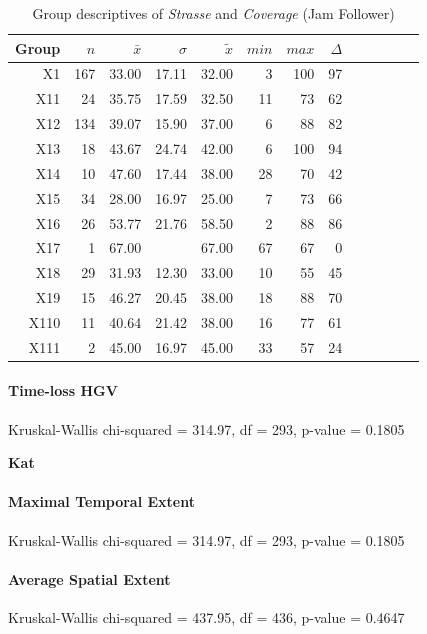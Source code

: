 \begin{table}[ht]
	\tiny
	\centering
	\begin{tabular}{rrrrrrrrrrrrr}
		\hline
		Group & $n$ & $\bar{x}$ & $\sigma$ & $\tilde{x}$ & $min$ & $max$ & $\Delta$ \\ 
		\hline
		X1  & 167 & 33.00 & 17.11 & 32.00 & 3  & 100 & 97 \\ 
		X11 & 24  & 35.75 & 17.59 & 32.50 & 11 & 73  & 62 \\ 
		X12 & 134 & 39.07 & 15.90 & 37.00 & 6  & 88  & 82 \\ 
		X13 & 18  & 43.67 & 24.74 & 42.00 & 6  & 100 & 94 \\ 
		X14 & 10  & 47.60 & 17.44 & 38.00 & 28 & 70  & 42 \\ 
		X15 & 34  & 28.00 & 16.97 & 25.00 & 7  & 73  & 66 \\ 
		X16 & 26  & 53.77 & 21.76 & 58.50 & 2  & 88  & 86 \\ 
		X17 & 1   & 67.00 &  	  & 67.00 & 67 & 67  & 0 \\  
		X18 & 29  & 31.93 & 12.30 & 33.00 & 10 & 55  & 45 \\ 
		X19 & 15  & 46.27 & 20.45 & 38.00 & 18 & 88  & 70 \\ 
		X110 & 11 & 40.64 & 21.42 & 38.00 & 16 & 77  & 61 \\ 
		X111 & 2  & 45.00 & 16.97 & 45.00 & 33 & 57  & 24 \\ 
		\hline
	  \end{tabular}
    \caption{Group descriptives of \textit{Strasse} and \textit{Coverage} (Jam Follower)}
    \label{tbl:descriptives_baysis_follower_Strasse_Cov}
\end{table}

\paragraph{Time-loss HGV}
Kruskal-Wallis chi-squared = 314.97, df = 293, p-value = 0.1805

\large
\centerline{\textbf{Kat}}
\normalsize

\paragraph{Maximal Temporal Extent}
Kruskal-Wallis chi-squared = 314.97, df = 293, p-value = 0.1805

\paragraph{Average Spatial Extent}
Kruskal-Wallis chi-squared = 437.95, df = 436, p-value = 0.4647

